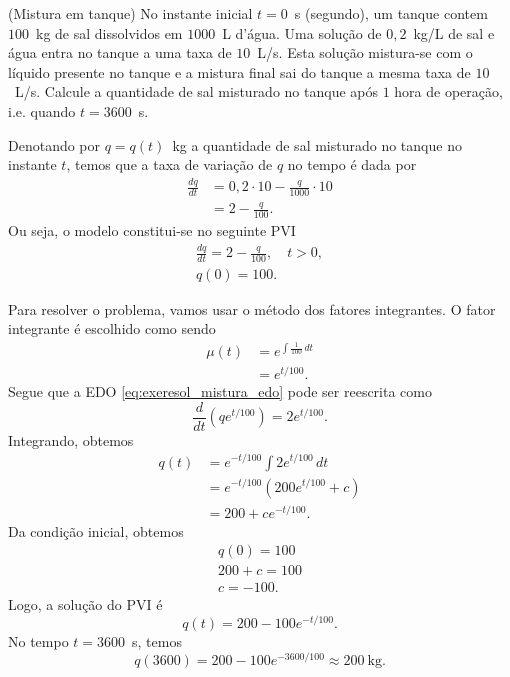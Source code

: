 \begin{exeresol}(Mistura em tanque)\label{exeresol:mistura_em_tanque}
  No instante inicial $t=0$~s (segundo), um tanque contem $100$~kg de sal dissolvidos em $1000$~L d'água. Uma solução de $0,2$~kg/L de sal e água entra no tanque a uma taxa de $10$~L/s. Esta solução mistura-se com o líquido presente no tanque e a mistura final sai do tanque a mesma taxa de $10$~L/s. Calcule a quantidade de sal misturado no tanque após $1$ hora de operação, i.e. quando $t=3600$~s.
\end{exeresol}
\begin{resol}
  Denotando por $q = q(t)$~kg a quantidade de sal misturado no tanque no instante $t$, temos que a taxa de variação de $q$ no tempo é dada por
  \begin{align}
    \frac{dq}{dt} &= 0,2\cdot 10 - \frac{q}{1000}\cdot 10 \\
                  &= 2 - \frac{q}{100}.
  \end{align}
  Ou seja, o modelo constitui-se no seguinte PVI
  \begin{align}
    \frac{dq}{dt} = 2 - \frac{q}{100},\quad t>0,\label{eq:exeresol_mistura_edo}\\
    q(0) = 100.
  \end{align}

  Para resolver o problema, vamos usar o método dos fatores integrantes. O fator integrante é escolhido como sendo
  \begin{align}
    \mu(t) &= e^{\int \frac{1}{100}\,dt} \\
           &= e^{t/100}.
  \end{align}
  Segue que a EDO \eqref{eq:exeresol_mistura_edo} pode ser reescrita como
  \begin{equation}
    \frac{d}{dt}\left(qe^{t/100}\right) = 2e^{t/100}.
  \end{equation}
  Integrando, obtemos
  \begin{align}
    q(t) &= e^{-t/100}\int 2e^{t/100}\,dt \\
         &= e^{-t/100}\left(200e^{t/100} + c\right) \\
         &= 200 + ce^{-t/100}.
  \end{align}
  Da condição inicial, obtemos
  \begin{gather}
    q(0) = 100 \\
    200 + c = 100 \\
    c = -100.
  \end{gather}
  Logo, a solução do PVI é
  \begin{equation}
    q(t) = 200 - 100e^{-t/100}.
  \end{equation}
  No tempo $t=3600$~s, temos
  \begin{equation}
    q(3600) = 200 - 100e^{-3600/100} \approx 200~\text{kg}.
  \end{equation}
\end{resol}

